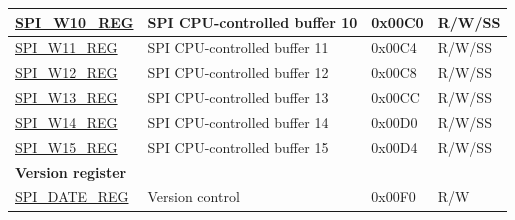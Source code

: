 \begin{longtable}{ | p{5.0cm} | p{7.2cm} | p{1.3cm} | p{2.0cm} | }
\hyperref[regdesc:SPIW10REG]{SPI\_W10\_REG} & SPI CPU-controlled buffer 10 & 0x00C0 & R/W/SS \\ \hline
\hyperref[regdesc:SPIW11REG]{SPI\_W11\_REG} & SPI CPU-controlled buffer 11 & 0x00C4 & R/W/SS \\ \hline
\hyperref[regdesc:SPIW12REG]{SPI\_W12\_REG} & SPI CPU-controlled buffer 12 & 0x00C8 & R/W/SS \\ \hline
\hyperref[regdesc:SPIW13REG]{SPI\_W13\_REG} & SPI CPU-controlled buffer 13 & 0x00CC & R/W/SS \\ \hline
\hyperref[regdesc:SPIW14REG]{SPI\_W14\_REG} & SPI CPU-controlled buffer 14 & 0x00D0 & R/W/SS \\ \hline
\hyperref[regdesc:SPIW15REG]{SPI\_W15\_REG} & SPI CPU-controlled buffer 15 & 0x00D4 & R/W/SS \\ \hline
\multicolumn{4}{|l|}{\textbf{Version register}} \\ \hline
\hyperref[regdesc:SPIDATEREG]{SPI\_DATE\_REG} & Version control & 0x00F0 & R/W \\ \hline
\end{longtable}